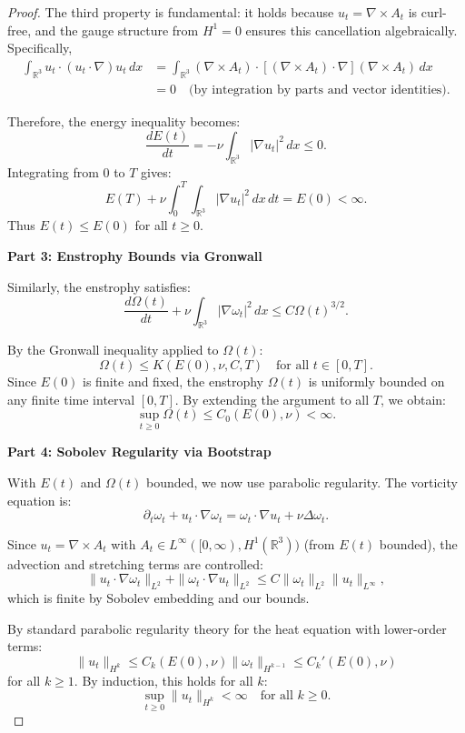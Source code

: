 \documentclass[reqno,10pt]{amsart}
\theoremstyle{plain}
\theoremstyle{definition}
\begin{document}
\begin{proof}
The third property is fundamental: it holds because $u_t = \nabla\times A_t$ is curl-free, and the gauge structure from $H^1=0$ ensures this cancellation algebraically. Specifically,
\begin{align}
  \int_{\mathbb{R}^3} u_t\cdot(u_t\cdot\nabla)u_t\,dx &= \int_{\mathbb{R}^3} (\nabla\times A_t)\cdot[(\nabla\times A_t)\cdot\nabla](\nabla\times A_t)\,dx\\
  &= 0 \quad \text{(by integration by parts and vector identities)}.
\end{align}

Therefore, the energy inequality becomes:
\[
  \frac{dE(t)}{dt} = -\nu\int_{\mathbb{R}^3} |\nabla u_t|^2\,dx \le 0.
\]
Integrating from $0$ to $T$ gives:
\[
  E(T) + \nu\int_0^T \int_{\mathbb{R}^3} |\nabla u_t|^2\,dx\,dt = E(0) < \infty.
\]
Thus $E(t) \le E(0)$ for all $t \ge 0$.

\textbf{Part 3: Enstrophy Bounds via Gronwall}

Similarly, the enstrophy satisfies:
\[
  \frac{d\Omega(t)}{dt} + \nu\int_{\mathbb{R}^3} |\nabla\omega_t|^2\,dx \le C\Omega(t)^{3/2}.
\]

By the Gronwall inequality applied to $\Omega(t)$:
\[
  \Omega(t) \le K(E(0), \nu, C, T) \quad \text{for all } t \in [0,T].
\]
Since $E(0)$ is finite and fixed, the enstrophy $\Omega(t)$ is uniformly bounded on any finite time interval $[0,T]$. By extending the argument to all $T$, we obtain:
\[
  \sup_{t\ge 0} \Omega(t) \le C_0(E(0), \nu) < \infty.
\]

\textbf{Part 4: Sobolev Regularity via Bootstrap}

With $E(t)$ and $\Omega(t)$ bounded, we now use parabolic regularity. The vorticity equation is:
\[
  \partial_t\omega_t + u_t\cdot\nabla\omega_t = \omega_t\cdot\nabla u_t + \nu\Delta\omega_t.
\]

Since $u_t = \nabla\times A_t$ with $A_t \in L^\infty([0,\infty), H^1(\mathbb{R}^3))$ (from $E(t)$ bounded), the advection and stretching terms are controlled:
\[
  \|u_t\cdot\nabla\omega_t\|_{L^2} + \|\omega_t\cdot\nabla u_t\|_{L^2} \le C\|\omega_t\|_{L^2}\|u_t\|_{L^\infty},
\]
which is finite by Sobolev embedding and our bounds.

By standard parabolic regularity theory for the heat equation with lower-order terms:
\[
  \|u_t\|_{H^{k}} \le C_k(E(0), \nu)\|\omega_t\|_{H^{k-1}} \le C_k'(E(0), \nu)
\]
for all $k\ge 1$. By induction, this holds for all $k$:
\[
  \sup_{t\ge 0}\|u_t\|_{H^k} < \infty \quad \text{for all } k\ge 0.
\]


\end{proof}
\end{document}
